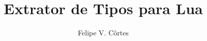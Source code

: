 \documentclass[mscr,american]{thesispuc}%
\author{Felipe V. Côrtes}
\title{Extrator de Tipos para Lua} %
\begin{document}
  
  
  \arial
   
\end{document}
